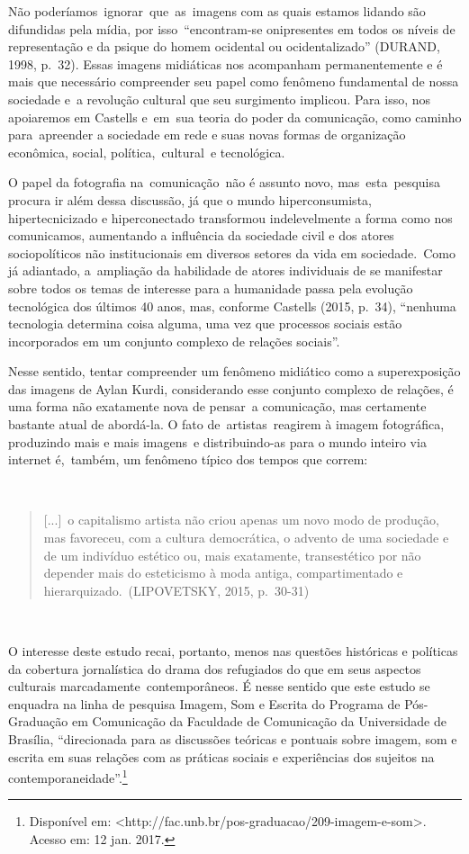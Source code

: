 \documentclass[
  letterpaper,
]{scrbook}
\begin{document}
Não poderíamos~ignorar~que~as~imagens com as quais estamos lidando são
difundidas pela mídia, por isso~``encontram-se onipresentes em todos os
níveis de representação e da psique do homem ocidental ou
ocidentalizado'' (DURAND, 1998, p.~32). Essas imagens midiáticas nos
acompanham permanentemente e é mais que necessário compreender seu papel
como fenômeno fundamental de nossa sociedade e~a revolução cultural que
seu surgimento implicou. Para isso, nos apoiaremos em Castells e~em~sua
teoria do poder da comunicação, como caminho para~apreender a sociedade
em rede e suas novas formas de organização econômica, social,
política,~cultural~e tecnológica.~

O papel da fotografia na~comunicação~não é assunto novo,
mas~esta~pesquisa procura ir além dessa discussão, já que o mundo
hiperconsumista, hipertecnicizado e hiperconectado transformou
indelevelmente a forma como nos comunicamos, aumentando a influência da
sociedade civil e dos atores sociopolíticos não institucionais em
diversos setores da vida em sociedade.~Como já adiantado, a~ampliação da
habilidade de atores individuais de se manifestar sobre todos os temas
de interesse para a humanidade passa pela evolução tecnológica dos
últimos 40 anos, mas, conforme Castells (2015, p.~34), ``nenhuma
tecnologia determina coisa alguma, uma vez que processos sociais estão
incorporados em um conjunto complexo de relações sociais''.

Nesse sentido, tentar compreender um fenômeno midiático como a
superexposição das imagens de Aylan Kurdi, considerando esse conjunto
complexo de relações, é uma forma não exatamente nova de pensar~a
comunicação, mas certamente bastante atual de abordá-la. O fato
de~artistas~reagirem à imagem fotográfica, produzindo mais e mais
imagens~e distribuindo-as para o mundo inteiro via internet é,~também,
um fenômeno típico dos tempos que correm:~

~

\begin{quote}
{[}...{]}~o capitalismo artista não criou apenas um novo modo de
produção, mas favoreceu, com a cultura democrática, o advento de uma
sociedade e de um indivíduo estético ou, mais exatamente, transestético
por não depender mais do esteticismo à moda antiga, compartimentado e
hierarquizado.~(LIPOVETSKY, 2015, p.~30-31)~
\end{quote}

~

O interesse deste estudo recai, portanto, menos nas questões históricas
e políticas da cobertura jornalística do drama dos refugiados do que em
seus aspectos culturais marcadamente~contemporâneos. É nesse sentido que
este estudo se enquadra na linha de pesquisa Imagem, Som e Escrita do
Programa de Pós-Graduação em Comunicação da Faculdade de Comunicação da
Universidade de Brasília, ``direcionada para as discussões teóricas e
pontuais sobre imagem, som e escrita em suas relações com as práticas
sociais e experiências dos sujeitos na contemporaneidade''.\footnote{Disponível
  em:
  \textless http://fac.unb.br/pos-graduacao/209-imagem-e-som\textgreater.
  Acesso em: 12 jan. 2017.}
\end{document}
